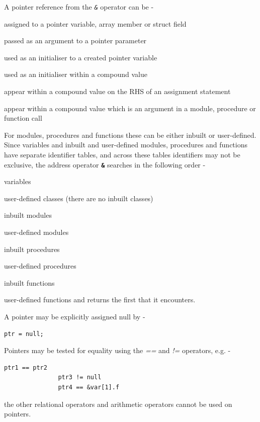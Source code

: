             A pointer reference from the {\em \verb'&'} operator can be -
            \blist
            \item   assigned to a pointer variable, array member or struct
                    field
            \item   passed as an argument to a pointer parameter
            \item   used as an initialiser to a created pointer variable
            \item   used as an initialiser within a compound value
            \item   appear within a compound value on the RHS of an
                    assignment statement
            \item   appear within a compound value which is an
                    argument in a module, procedure or function call
            \blend
            
            For modules, procedures and functions these can be either inbuilt or
            user-defined. Since variables and inbuilt and user-defined modules,
            procedures and functions have separate identifier tables, and across these
            tables identifiers may not be exclusive, the address operator {\bf
            \verb'&'} searches in the following order -
            \blist
            \item   variables
            \item   user-defined classes (there are no inbuilt classes)
            \item   inbuilt modules
            \item   user-defined modules
            \item   inbuilt procedures
            \item   user-defined procedures
            \item   inbuilt functions
            \item   user-defined functions
            \blend
            and returns the first that it encounters.

            A pointer may be explicitly assigned null by -
            \begin{lstlisting}[gobble=12, language=threepl]
               ptr = null;
            \end{lstlisting}

            Pointers may be tested for equality using the {\em ==} and {\em
            !=} operators, e.g. -
            \begin{lstlisting}[gobble=12, language=threepl]
               ptr1 == ptr2
               ptr3 != null
               ptr4 == &var[1].f
            \end{lstlisting}
            the other relational operators and arithmetic operators cannot be
            used on pointers.

